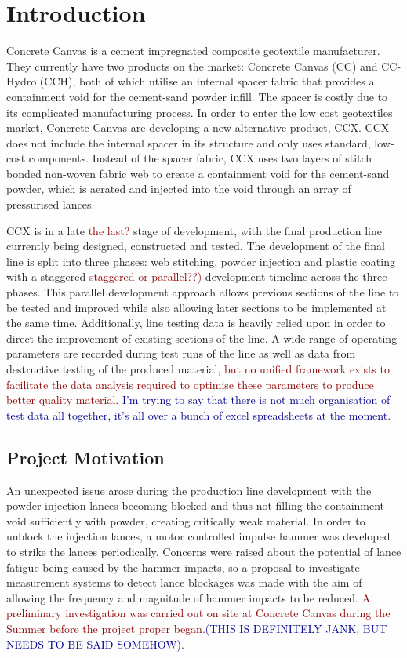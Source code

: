 \documentclass[12pt]{report}
\newcommand{\tcr}[1]{\textcolor{darkRed}{#1}}
\newcommand{\tcb}[1]{\textcolor{darkBlue}{#1}}
\begin{document}
\tableofcontents

\chapter{Introduction}
    
    Concrete Canvas is a cement impregnated composite geotextile manufacturer. They currently have two products on the market: Concrete Canvas (CC) and CC-Hydro (CCH), both of which utilise an internal spacer fabric that provides a containment void for the cement-sand powder infill. The spacer is costly due to its complicated manufacturing process. In order to enter the low cost geotextiles market, Concrete Canvas are developing a new alternative product, CCX. CCX does not include the internal spacer in its structure and only uses standard, low-cost components. Instead of the spacer fabric, CCX uses two layers of stitch bonded non-woven fabric web to create a containment void for the cement-sand powder, which is aerated and injected into the void through an array of pressurised lances.
    
    CCX is in a late \tcr{the last?} stage of development, with the final production line currently being designed, constructed and tested. The development of the final line is split into three phases: web stitching, powder injection and plastic coating with a staggered \tcr{staggered or parallel??)} development timeline across the three phases. This parallel development approach allows previous sections of the line to be tested and improved while also allowing later sections to be implemented at the same time. Additionally, line testing data is heavily relied upon in order to direct the improvement of existing sections of the line. A wide range of operating parameters are recorded during test runs of the line as well as data from destructive testing of the produced material, \tcr{but no unified framework exists to facilitate the data analysis required to optimise these parameters to produce better quality material.} \tcb{I'm trying to say that there is not much organisation of test data all together, it's all over a bunch of excel spreadsheets at the moment}. 
    
    \section{Project Motivation}
        An unexpected issue arose during the production line development with the powder injection lances becoming blocked and thus not filling the containment void sufficiently with powder, creating critically weak material. In order to unblock the injection lances, a motor controlled impulse hammer was developed to strike the lances periodically. Concerns were raised about the potential of lance fatigue being caused by the hammer impacts, so a proposal to investigate measurement systems to detect lance blockages was made with the aim of allowing the frequency and magnitude of hammer impacts to be reduced. \tcr{A preliminary investigation was carried out on site at Concrete Canvas during the Summer before the project proper began.}\tcb{(THIS IS DEFINITELY JANK, BUT NEEDS TO BE SAID SOMEHOW)}.
        
\end{document}

